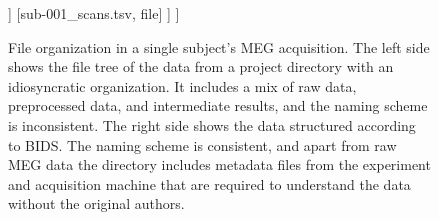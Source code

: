 \begin{figure}[H]
{\begin{minipage}{.49\textwidth}
\begin{forest}
				]
				[sub-001\_scans.tsv, file]
				]
				]
			\end{forest}
		\end{minipage}
	}
	\caption[An example of a BIDS-structured dataset]{File organization in a single subject's MEG acquisition. The left side shows the file tree of the data from a project directory with an idiosyncratic organization. It includes a mix of raw data, preprocessed data, and intermediate results, and the naming scheme is inconsistent. The right side shows the data structured according to \gls{BIDS}. The naming scheme is consistent, and apart from raw MEG data the directory includes metadata files from the experiment and acquisition machine that are required to understand the data without the original authors.}
	\label{fig:BIDS}
\end{figure}

